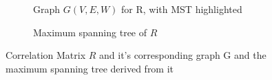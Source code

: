 \begin{figure}[!ht]
\begin{subfigure}[b]{0.5\textwidth}
\centering
\caption {Graph $G(V,E,W)$ for R, with MST highlighted}
\label{fig:corrMatTree}
\end{subfigure}
\hfill
\begin{subfigure}[b]{0.3\textwidth}
\caption{Maximum spanning tree of $R$}
\label{fig:corrMST}
\end{subfigure}
\centering
\caption{Correlation Matrix $R$ and it's corresponding graph G and the maximum spanning tree derived from it}
\label{fig:materFig}
\end{figure}


 

